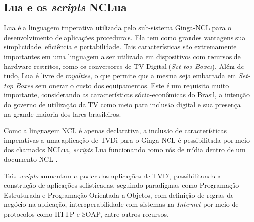 \begin{comment}
Desde a versão 1.0 do mesmo, ele permite não somente o tráfego de hipertexto como também
de qualquer formato de arquivo definido pelos tipos MIME (\textit{Multipurpose Internet Mail Extensions}), 
cuja especificação é dada pela RFC 2045 \cite{rfc2045}.

Até o HTTP/1.0, o protocolo não permitia conexões persistentes, sendo um protocolo \textit{stateless},
não guardando qualquer informações no servidor sobre as requisições recebidas, o que 
requer menos uso de memória por parte do servidor, ajudando a reduzir a sobrecarga do mesmo.
Desta forma, para o servidor, cada requisição é uma nova requisição.
A versão 1.1 introduziu o uso de conexões persistentes, no entanto, a forma tradicional ainda
é a mais utilizada, principalmente no transporte de conteúdo HTML (páginas Web) e XML.
\end{comment}

\subsection{Lua e os \textit{scripts} NCLua} \label{sec:lua-nclua}

Lua é a linguagem imperativa utilizada pelo sub-sistema Ginga-NCL para o desenvolvimento
de aplicações procedurais. Ela tem como grandes vantagens sua simplicidade, eficiência e portabilidade. 
Tais características são extremamente importantes em uma linguagem a ser utilizada em dispositivos com recursos de hardware restritos, 
como os conversores de TV Digital (\textit{Set-top Boxes}). Além de tudo, Lua é livre de \textit{royalties}, o que permite
que a mesma seja embarcada em \textit{Set-top Boxes} sem onerar o custo dos equipamentos. Este é um requisito
muito importante, considerando as características sócio-econômicas do Brasil, a intenção do governo de 
utilização da TV como meio para inclusão digital e sua presença na grande maioria
dos lares brasileiros.

Como a linguagem NCL é apenas declarativa, a inclusão de características imperativas
a uma aplicação de TVDi para o Ginga-NCL é possibilitada por meio dos chamados
NCLua, \textit{scripts} Lua funcionando como nós de mídia dentro de um documento NCL 
\cite{abnt200815606} \cite{soares2007ginga}. 

Tais \textit{scripts} aumentam o poder das aplicações de TVDi, possibilitando a construção
de aplicações sofisticadas, seguindo paradigmas como Programação Estruturada e Programação Orientada a Objetos,
com definição de regras de negócio na aplicação, interoperabilidade com sistemas na \textit{Internet}
por meio de protocolos como HTTP e SOAP, entre outros recursos.

